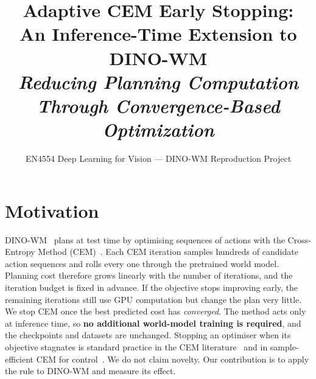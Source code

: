 \documentclass[10pt]{article}
\title{\textbf{Adaptive CEM Early Stopping:\\ An Inference-Time Extension to DINO-WM}\\[0.4em]
\large\textit{Reducing Planning Computation Through Convergence-Based Optimization}}
\author{EN4554 Deep Learning for Vision --- DINO-WM Reproduction Project}
\date{}
\begin{document}
\maketitle
\vspace{-3.6em}

\begin{center}
\end{center}

\section{Motivation}

DINO-WM~\cite{zhou2024dinowm} plans at test time by optimising sequences of actions with the
Cross-Entropy Method (CEM)~\cite{rubinstein2004cem}. Each CEM iteration samples hundreds of candidate
action sequences and rolls every one through the pretrained world model. Planning cost therefore
grows linearly with the number of iterations, and the iteration budget is fixed in advance. If the
objective stops improving early, the remaining iterations still use GPU computation but change the plan very little.
We stop CEM once the best predicted cost has \emph{converged}. The method acts only at inference
time, so \textbf{no additional world-model training is required}, and the checkpoints and datasets are
unchanged. Stopping an optimiser when its objective stagnates is standard practice in the CEM
literature~\cite{rubinstein2004cem} and in sample-efficient CEM for control~\cite{pinneri2020icem}. We do not claim
novelty. Our contribution is to apply the rule to DINO-WM and measure its effect.

\end{document}
